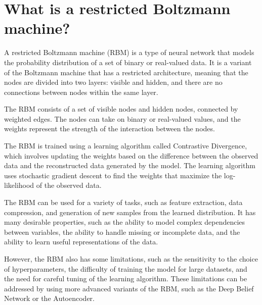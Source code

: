 \section{What is a restricted Boltzmann machine?}
A restricted Boltzmann machine (RBM) is a type of neural network that models the probability distribution of a set of binary or real-valued data. It is a variant of the Boltzmann machine that has a restricted architecture, meaning that the nodes are divided into two layers: visible and hidden, and there are no connections between nodes within the same layer.

The RBM consists of a set of visible nodes and hidden nodes, connected by weighted edges. The nodes can take on binary or real-valued values, and the weights represent the strength of the interaction between the nodes.

The RBM is trained using a learning algorithm called Contrastive Divergence, which involves updating the weights based on the difference between the observed data and the reconstructed data generated by the model. The learning algorithm uses stochastic gradient descent to find the weights that maximize the log-likelihood of the observed data.

The RBM can be used for a variety of tasks, such as feature extraction, data compression, and generation of new samples from the learned distribution. It has many desirable properties, such as the ability to model complex dependencies between variables, the ability to handle missing or incomplete data, and the ability to learn useful representations of the data.

However, the RBM also has some limitations, such as the sensitivity to the choice of hyperparameters, the difficulty of training the model for large datasets, and the need for careful tuning of the learning algorithm. These limitations can be addressed by using more advanced variants of the RBM, such as the Deep Belief Network or the Autoencoder.


